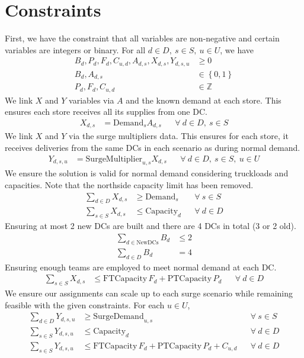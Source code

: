 \documentclass[11pt,a4paper]{article}
\begin{document}
\section{Constraints}
First, we have the constraint that all variables are non-negative and certain variables 
are integers or binary. For all $d \in D,~s \in S, ~u \in U$, we have
\begin{align*}
    B_d, P_d, F_d, C_{u,d}, A_{d,s}, X_{d,s}, Y_{d,s,u}  &\ge 0  \\ 
    B_d, A_{d,s} &\in  \left\{ 0, 1\right\} \\ 
    P_d, F_d, C_{u,d} &\in \mathbb Z
\end{align*}
We link $X$ and $Y$ variables via $A$ and the known demand at each store. This ensures 
each store receives all its supplies from one DC.
\begin{align*}
    X_{d,s} &= \mathrm{Demand}_s A_{d,s} && \forall~d \in D, ~s \in S
\end{align*}
We link $X$ and $Y$ via the surge multipliers data. This ensures for each store, 
it receives deliveries from the same DCs in each scenario as during normal demand. 
\begin{align*}
    Y_{d,s,u} &= \mathrm{SurgeMultiplier}_{u,s} X_{d,s} && \forall~d \in D,~s \in S,~u \in U
\end{align*}
We ensure the solution is valid for normal demand considering 
truckloads and capacities. Note that the northside capacity limit has been removed.
\begin{align*}
    \sum_{d \in D} X_{d,s} &\ge \mathrm{Demand}_{s} &&\forall~s \in S \\ 
    \sum_{s \in S} X_{d,s} &\le \mathrm{Capacity}_d &&\forall~d \in D 
\end{align*}
Ensuring at most 2 new DCs are built and there are 4 DCs in total (3 or 2 old).
\begin{align*}
    \sum_{d \in \mathrm{NewDCs}} B_d &\le 2 \\ 
    \sum_{d \in D} B_d &= 4 
\end{align*}
Ensuring enough teams are employed to meet normal demand at each DC.
\begin{align*}
    \sum_{s \in S} X_{d,s} &\le \mathrm{FTCapacity}\,F_d + \mathrm{PTCapacity}\,P_d && \forall~d \in D
\end{align*}
We ensure our assignments can scale up to each surge scenario while remaining 
feasible with the given constraints. 
For each $u \in U$,
\begin{align*}
    \sum_{d \in D} Y_{d,s,u} &\ge \mathrm{SurgeDemand}_{u,s} &&\forall~s \in S \\ 
    \sum_{s \in S} Y_{d,s,u} &\le \mathrm{Capacity}_d &&\forall~d \in D \\ 
    \sum_{s \in S} Y_{d,s,u} &\le \mathrm{FTCapacity}\,F_d + \mathrm{PTCapacity}\,P_d + C_{u,d} && \forall~d \in D
\end{align*}
\end{document}
